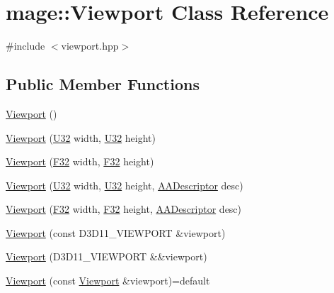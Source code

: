\hypertarget{classmage_1_1_viewport}{}\section{mage\+:\+:Viewport Class Reference}
\label{classmage_1_1_viewport}


{\ttfamily \#include $<$viewport.\+hpp$>$}

\subsection*{Public Member Functions}
\begin{DoxyCompactItemize}
\item 
\hyperlink{classmage_1_1_viewport_ab189482e477d46a63c514f59e09ca31b}{Viewport} ()
\item 
\hyperlink{classmage_1_1_viewport_af9a0c9e372658819d15547818c90d924}{Viewport} (\hyperlink{namespacemage_a41c104c036fba3756a74e19f793eeaa1}{U32} width, \hyperlink{namespacemage_a41c104c036fba3756a74e19f793eeaa1}{U32} height)
\item 
\hyperlink{classmage_1_1_viewport_a266bc22802adb77a0d1b22b65204f83c}{Viewport} (\hyperlink{namespacemage_aa97e833b45f06d60a0a9c4fc22ae02c0}{F32} width, \hyperlink{namespacemage_aa97e833b45f06d60a0a9c4fc22ae02c0}{F32} height)
\item 
\hyperlink{classmage_1_1_viewport_aff096204ce4053419e1ca114680ff77c}{Viewport} (\hyperlink{namespacemage_a41c104c036fba3756a74e19f793eeaa1}{U32} width, \hyperlink{namespacemage_a41c104c036fba3756a74e19f793eeaa1}{U32} height, \hyperlink{namespacemage_a86cd40b8f2f42ca4d616cc6ec665a7f2}{A\+A\+Descriptor} desc)
\item 
\hyperlink{classmage_1_1_viewport_a2de32aec8f1fad96906a80e8ec833000}{Viewport} (\hyperlink{namespacemage_aa97e833b45f06d60a0a9c4fc22ae02c0}{F32} width, \hyperlink{namespacemage_aa97e833b45f06d60a0a9c4fc22ae02c0}{F32} height, \hyperlink{namespacemage_a86cd40b8f2f42ca4d616cc6ec665a7f2}{A\+A\+Descriptor} desc)
\item 
\hyperlink{classmage_1_1_viewport_a30e0141573acb18a4f8b1ef0aa46c8e0}{Viewport} (const D3\+D11\+\_\+\+V\+I\+E\+W\+P\+O\+RT \&viewport)
\item 
\hyperlink{classmage_1_1_viewport_a44d0f073e593ce4db5c88fad276ffbcf}{Viewport} (D3\+D11\+\_\+\+V\+I\+E\+W\+P\+O\+RT \&\&viewport)
\item 
\hyperlink{classmage_1_1_viewport_ae94d36685270b07e64730aa4eaad8d66}{Viewport} (const \hyperlink{classmage_1_1_viewport}{Viewport} \&viewport)=default

\end{DoxyCompactItemize}
